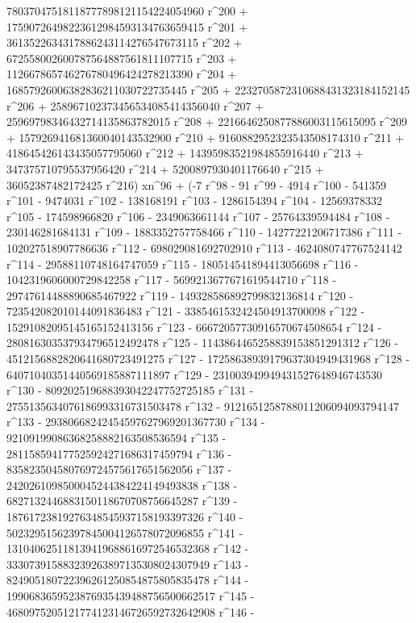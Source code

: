        78037047518118777898121154224054960 r^200 + 
       17590726498223612984593134763659415 r^201 + 
       3613522634317886243114276547673115 r^202 + 
       672558002600787564887561811107715 r^203 + 
       112667865746276780496424278213390 r^204 + 
       16857926006382836211030722735445 r^205 + 
       2232705872310688431323184152145 r^206 + 
       258967102373456534085414356040 r^207 + 
       25969798346432714135863782015 r^208 + 
       2216646250877886003115615095 r^209 + 
       157926941681360040143532900 r^210 + 
       9160882952323543508174310 r^211 + 
       418645426143435057795060 r^212 + 
       14395983521984855916440 r^213 + 347375710795537956420 r^214 + 
       5200897930401176640 r^215 + 
       36052387482172425 r^216) xn^96 + (-7 r^98 - 91 r^99 - 
       4914 r^100 - 541359 r^101 - 9474031 r^102 - 138168191 r^103 - 
       1286154394 r^104 - 12569378332 r^105 - 174598966820 r^106 - 
       2349063661144 r^107 - 25764339594484 r^108 - 
       230146281684131 r^109 - 1883352757758466 r^110 - 
       14277221206717386 r^111 - 102027518907786636 r^112 - 
       698029081692702910 r^113 - 4624080747767524142 r^114 - 
       29588110748164747059 r^115 - 180514541894413056698 r^116 - 
       1042319606000729842258 r^117 - 5699213677671619544710 r^118 - 
       29747614488890685467922 r^119 - 
       149328586892799832136814 r^120 - 
       723542082010144091836483 r^121 - 
       3385461532424504913700098 r^122 - 
       15291082095145165152413156 r^123 - 
       66672057730916570674508654 r^124 - 
       280816303537934796512492478 r^125 - 
       1143864465258839153851291312 r^126 - 
       4512156882820641680723491275 r^127 - 
       17258638939179637304949431968 r^128 - 
       64071040351440569185887111897 r^129 - 
       231003949949431527648946743530 r^130 - 
       809202519688393042247752725185 r^131 - 
       2755135634076186993316731503478 r^132 - 
       9121651258788011206094093794147 r^133 - 
       29380668242454597627969201367730 r^134 - 
       92109199086368258882163508536594 r^135 - 
       281158594177525924271686317459794 r^136 - 
       835823504580769724575617651562056 r^137 - 
       2420261098500045244384224149493838 r^138 - 
       6827132446883150118670708756645287 r^139 - 
       18761723819276348545937158193397326 r^140 - 
       50232951562397845004126578072096855 r^141 - 
       131040625118139419688616972546532368 r^142 - 
       333073915883239263897135308024307949 r^143 - 
       824905180722396261250854875805835478 r^144 - 
       1990683659523876935439488756500662517 r^145 - 
       4680975205121774123146726592732642908 r^146 - 
